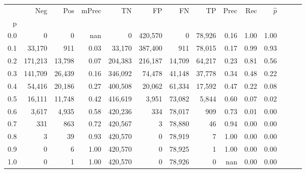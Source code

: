 \begin{tabular}{rrrrrrrrrrrrrr}
\toprule
{} &      Neg &     Pos & mPrec &       TN &       FP &      FN &      TP &  Prec &   Rec & $\hat{p}$ \\
p   &          &         &       &          &          &         &         &       &       &           \\
\midrule
0.0 &        0 &       0 &   nan &        0 &  420,570 &       0 &  78,926 &  0.16 &  1.00 &      1.00 \\
0.1 &   33,170 &     911 &  0.03 &   33,170 &  387,400 &     911 &  78,015 &  0.17 &  0.99 &      0.93 \\
0.2 &  171,213 &  13,798 &  0.07 &  204,383 &  216,187 &  14,709 &  64,217 &  0.23 &  0.81 &      0.56 \\
0.3 &  141,709 &  26,439 &  0.16 &  346,092 &   74,478 &  41,148 &  37,778 &  0.34 &  0.48 &      0.22 \\
0.4 &   54,416 &  20,186 &  0.27 &  400,508 &   20,062 &  61,334 &  17,592 &  0.47 &  0.22 &      0.08 \\
0.5 &   16,111 &  11,748 &  0.42 &  416,619 &    3,951 &  73,082 &   5,844 &  0.60 &  0.07 &      0.02 \\
0.6 &    3,617 &   4,935 &  0.58 &  420,236 &      334 &  78,017 &     909 &  0.73 &  0.01 &      0.00 \\
0.7 &      331 &     863 &  0.72 &  420,567 &        3 &  78,880 &      46 &  0.94 &  0.00 &      0.00 \\
0.8 &        3 &      39 &  0.93 &  420,570 &        0 &  78,919 &       7 &  1.00 &  0.00 &      0.00 \\
0.9 &        0 &       6 &  1.00 &  420,570 &        0 &  78,925 &       1 &  1.00 &  0.00 &      0.00 \\
1.0 &        0 &       1 &  1.00 &  420,570 &        0 &  78,926 &       0 &   nan &  0.00 &      0.00 \\
\bottomrule
\end{tabular}

